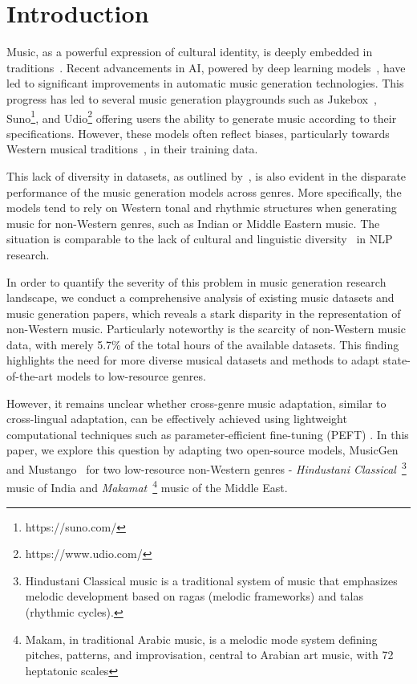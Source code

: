 \section{Introduction}

Music, as a powerful expression of cultural identity, is deeply embedded in traditions~\cite{10.1093/mq/79.2.281, chung2006digital}. Recent advancements in AI, powered by deep learning models~\cite{c:24,c:23,c:22}, have led to significant improvements in automatic music generation technologies. This progress has led to several music generation playgrounds such as Jukebox~\cite{c:25}, Suno\footnote{https://suno.com/}, and Udio\footnote{https://www.udio.com/} offering users the ability to generate music according to their specifications. However, these models often reflect biases, particularly towards Western musical traditions~\cite{10.1093/pnasnexus/pgae346, c:23}, in their training data. 

This lack of diversity in datasets, as outlined by~\citet{c:23, melechovsky-etal-2024-mustango, c:25}, is also evident in the disparate performance of the music generation models across genres. More specifically, the models tend to rely on Western tonal and rhythmic structures when generating music for non-Western genres, such as Indian or Middle Eastern music. The situation is comparable to the lack of cultural and linguistic diversity~\cite{c:27, bender-2018, bender2021dangers} in NLP research.


In order to quantify the severity of this problem in music generation research landscape, we conduct a comprehensive analysis of existing music datasets and music generation papers, which reveals a stark disparity in the representation of non-Western music. Particularly noteworthy is the scarcity of non-Western music data, with merely 5.7\% of the total hours of the available datasets. This finding highlights the need for more diverse musical datasets and methods to adapt state-of-the-art models to low-resource genres. 

However, it remains unclear whether cross-genre music adaptation, similar to cross-lingual adaptation, can be effectively achieved using lightweight computational techniques such as parameter-efficient fine-tuning (PEFT) \cite{houlsby2019parameter}. In this paper, we explore this question by adapting two open-source models, MusicGen~\cite{c:23} and Mustango~\cite{melechovsky-etal-2024-mustango} for two low-resource non-Western genres - \textit{Hindustani Classical}~\footnote{Hindustani Classical music is a traditional system of music that emphasizes melodic development based on ragas (melodic frameworks) and talas (rhythmic cycles).} music of India and \textit{Makamat}~\footnote{Makam, in traditional Arabic music, is a melodic mode system defining pitches, patterns, and improvisation, central to Arabian art music, with 72 heptatonic scales} music of the Middle East.

